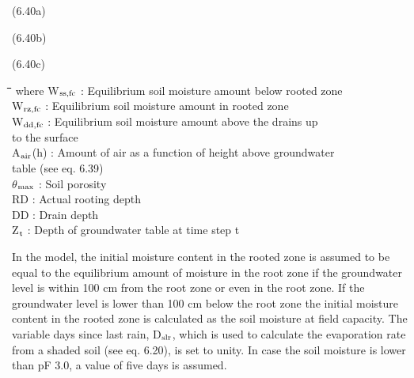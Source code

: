 \documentclass[11pt]{article}
\begin{document}
 \bigskip
\strut\hfill (6.40a)\\
\strut\hfill (6.40b)\\
\strut\hfill (6.40c)
\nwln
\begin{tabbing}
\hspace{1.27cm}\=\hspace{1.27cm}\=\hspace{1.27cm}\=\hspace{1.27cm}\=%
\hspace{1.27cm}\=\hspace{1.27cm}\=\hspace{1.27cm}\=\hspace{1.27cm}\=%
\hspace{1.27cm}\=\hspace{1.27cm}\=\kill
where\> W$_{{\rm ss,fc}}$\> : Equilibrium soil moisture amount below rooted zone\> \> \> \> \> \> \> \> [cm]\\
\>W$_{{\rm rz,fc}}$\> : Equilibrium soil moisture amount in rooted zone\> \> \> \> \> \> \> \> [cm]\\
\>W$_{{\rm dd,fc}}$\> : Equilibrium soil moisture amount above the drains up \\
\>\>   to the surface\> \> \> \> \> \> \> \> [cm]\\
\>A$_{{\rm air}}$(h)\> : Amount of air as a function of height above groundwater\\
\>\>   table (see eq. 6.39)\> \> \> \> \> \> \> \> [cm]\\
\>$\theta$$_{{\rm max}}$\> : Soil porosity\> \> \> \> \> \> \> \> [cm$^{{\rm 3}}$ cm$^{{\rm -3}}$]\\
\>RD\> : Actual rooting depth\> \> \> \> \> \> \> \> [cm]\\
\>DD\> : Drain depth\> \> \> \> \> \> \> \> [cm]\\
\>Z$_{{\rm t}}$\> : Depth of groundwater table at time step t\> \> \> \> \> \> \> \> [cm]
\end{tabbing}

\bigskip
\bigskip
In the model, the initial moisture content in the rooted zone is assumed to be equal to the
equilibrium amount of moisture in the root zone if the groundwater level is within 100 cm
from the root zone or even in the root zone. If the groundwater level is lower than 100
cm below the root zone the initial moisture content in the rooted zone is calculated as the
soil moisture at field capacity. The variable days since last rain, D$_{{\rm slr}}$, which is used to
calculate the evaporation rate from a shaded soil (see eq. 6.20), is set to unity. In case the
soil moisture is lower than pF 3.0, a value of five days is assumed.
\end{document}
